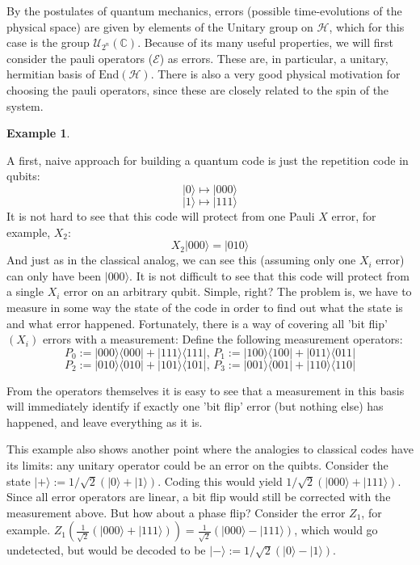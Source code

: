 \documentclass{article}
\def\E{\mathcal{E}}
\def\C{\mathbb{C}}
\def\End{\text{End}}
\def\H{\mathcal{H}}
\theoremstyle{definition}
\newtheorem{ex}[Satz]{Example}
\begin{document}
By the postulates of quantum mechanics, errors (possible time-evolutions of the physical space) are given by elements of the Unitary group on $\mathcal{H}$, which for this case is the group $\mathcal{U}_{2^n}(\C)$.
Because of its many useful properties, we will first consider the pauli operators ($\E$) as errors. These are, in particular, a unitary, hermitian basis of $\End(\H)$. There is also a very good physical motivation for choosing the pauli operators, since these are closely related to the spin of the system.

\begin{ex} \label{repetitionqubits}

  A first, naive approach for building a quantum code is just the repetition code in qubits: 
  \[ |0\rangle \mapsto |000\rangle \]
  \[ |1\rangle \mapsto |111\rangle \]
  It is not hard to see that this code will protect from one Pauli $X$ error, for example, $X_2$:
  \[ X_2 |000 \rangle = |010 \rangle \]
  And just as in the classical analog, we can see this (assuming only one $X_i$ error) can only have been $|000 \rangle$. It is not difficult to see that this code will protect from a single $X_i$ error on an arbitrary qubit.
  Simple, right? The problem is, we have to measure in some way the state of the code in order to find out what the state is and what error happened. Fortunately, there is a way of covering all 'bit flip' $(X_i)$ errors with a measurement:
  Define the following measurement operators: 
  \[ P_0 := |000\rangle \langle 000 | + |111\rangle \langle 111 | \text{,    } P_1 := |100\rangle \langle 100 | + |011\rangle \langle 011 | \]
  \[ P_2 := |010\rangle \langle 010 | + |101\rangle \langle 101 | \text{,    } P_3 := |001\rangle \langle 001 | + |110\rangle \langle 110 | \]

  From the operators themselves it is easy to see that a measurement in this basis will immediately identify if exactly one 'bit flip' error (but nothing else) has happened, and leave everything as it is.
\end{ex}

  This example also shows another point where the analogies to classical codes have its limits: any unitary operator could be an error on the quibts.
  Consider the state $| + \rangle := 1/\sqrt{2}(|0\rangle + |1\rangle)$. Coding this would yield $1/\sqrt{2}(|000\rangle + |111\rangle)$. Since all error operators are linear, a bit flip would still be corrected with the measurement above. But how about a phase flip?
  Consider the error $Z_1$, for example. $Z_1 (\frac{1}{ \sqrt{2}} (|000\rangle + |111\rangle)) = \frac{1}{ \sqrt{2} }(|000\rangle - |111\rangle)$, which would go undetected, but would be decoded to be $|- \rangle := 1/\sqrt{2}(|0\rangle - |1\rangle)$.
  
\end{document}
